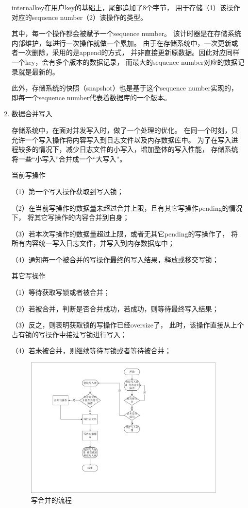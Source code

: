 \begin{enumerate}
		internalkey在用户key的基础上，尾部追加了8个字节，
		用于存储（1）该操作对应的sequence number（2）该操作的类型。

		其中，每一个操作都会被赋予一个sequence number。
		该计时器是在存储系统内部维护，每进行一次操作就做一个累加。
		由于在存储系统中，一次更新或者一次删除，采用的是append的方式，
		并非直接更新原数据。因此对应同样一个key，会有多个版本的数据记录，
		而最大的sequence number对应的数据记录就是最新的。

		此外，存储系统的快照（snapshot）也是基于这个sequence number实现的，
		即每一个sequence number代表着数据库的一个版本。

		\item 数据合并写入
		
		存储系统中，在面对并发写入时，做了一个处理的优化。
		在同一个时刻，只允许一个写入操作将内容写入到日志文件以及内存数据库中。
		为了在写入进程较多的情况下，减少日志文件的小写入，增加整体的写入性能，
		存储系统将一些“小写入”合并成一个“大写入”。

		当前写操作

		（1）第一个写入操作获取到写入锁；
		
		（2）在当前写操作的数据量未超过合并上限，且有其它写操作pending的情况下，
		将其它写操作的内容合并到自身；
		
		（3）若本次写操作的数据量超过上限，或者无其它pending的写操作了，
		将所有内容统一写入日志文件，并写入到内存数据库中；
		
		（4）通知每一个被合并的写操作最终的写入结果，释放或移交写锁；

		其它写操作

		（1）等待获取写锁或者被合并；
		
		（2）若被合并，判断是否合并成功，若成功，则等待最终写入结果；
		
		（3）反之，则表明获取锁的写操作已经oversize了，
		此时，该操作直接从上个占有锁的写操作中接过写锁进行写入；
		
		（4）若未被合并，则继续等待写锁或者等待被合并；

		\begin{figure}[H]
			\centering
			\includegraphics[width=0.95\textwidth]{pdf/write_merge.pdf}
			\caption{写合并的流程}
			\label{write_merge}
		\end{figure}


\end{enumerate}
